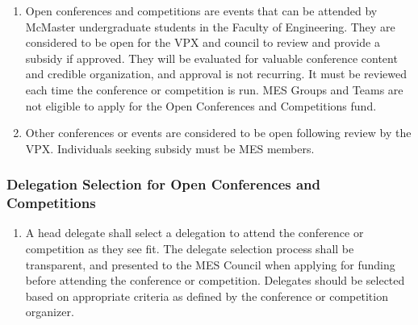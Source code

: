 \begin{enumerate}
 \item
  Open conferences and competitions are events that can be attended by
  McMaster undergraduate students in the Faculty of Engineering. They
  are considered to be open for the VPX and council to review and
  provide a subsidy if approved. They will be evaluated for valuable
  conference content and credible organization, and approval is not
  recurring. It must be reviewed each time the conference or competition
  is run. MES Groups and Teams are not eligible to apply for the Open
  Conferences and Competitions fund.
 \item
  Other conferences or events are considered to be open following review
  by the VPX. Individuals seeking subsidy must be MES members.

\end{enumerate}

\hypertarget{delegation-selection-for-open-conferences-and-competitions}{%
 \subsubsection{Delegation Selection for Open Conferences and
  Competitions}
 \label{delegation-selection-for-open-conferences-and-competitions}}

\begin{enumerate}
 \item
  A head delegate shall select a delegation to attend the conference or
  competition as they see fit. The delegate selection process shall be
  transparent, and presented to the MES Council when applying for
  funding before attending the conference or competition. Delegates
  should be selected based on appropriate criteria as defined by the
  conference or competition organizer.
\end{enumerate}

